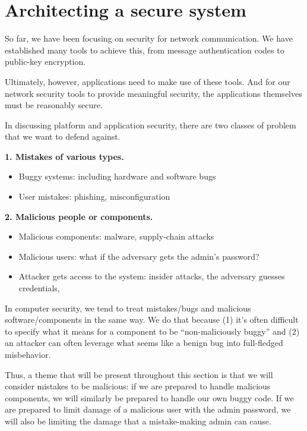 \documentclass[
  letterpaper,
]{scrbook}
\providecommand{\tightlist}{%
  \setlength{\itemsep}{0pt}\setlength{\parskip}{0pt}}
\theoremstyle{definition}
\theoremstyle{plain}
\theoremstyle{plain}
\theoremstyle{remark}
\begin{document}
\chapter{Architecting a secure
system}\label{architecting-a-secure-system}

So far, we have been focusing on security for network communication. We
have established many tools to achieve this, from message authentication
codes to public-key encryption.

Ultimately, however, applications need to make use of these tools. And
for our network security tools to provide meaningful security, the
applications themselves must be reasonably secure.

In discussing platform and application security, there are two classes
of problem that we want to defend against.

\textbf{1. Mistakes of various types.}

\begin{itemize}
\tightlist
\item
  Buggy systems: including hardware and software bugs
\item
  User mistakes: phishing, misconfiguration
\end{itemize}

\textbf{2. Malicious people or components.}

\begin{itemize}
\tightlist
\item
  Malicious components: malware, supply-chain attacks
\item
  Malicious users: what if the adversary gets the admin's password?
\item
  Attacker gets access to the system: insider attacks, the adversary
  guesses credentials,
\end{itemize}

In computer security, we tend to treat mistakes/bugs and malicious
software/components in the same way. We do that because (1) it's often
difficult to specify what it means for a component to be
``non-maliciously buggy'' and (2) an attacker can often leverage what
seems like a benign bug into full-fledged misbehavior.

Thus, a theme that will be present throughout this section is that we
will consider mistakes to be malicious: if we are prepared to handle
malicious components, we will similarly be prepared to handle our own
buggy code. If we are prepared to limit damage of a malicious user with
the admin password, we will also be limiting the damage that a
mistake-making admin can cause.
\end{document}

